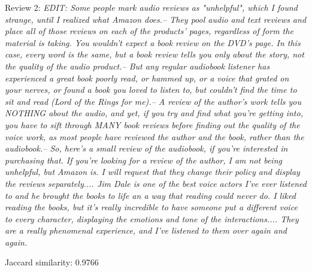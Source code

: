 \documentclass[12pt, a4paper]{article}
\begin{document}
\begin{itemize}
{    \item Review 2: \textit{EDIT: Some people mark audio reviews as "unhelpful", which I found strange, until I realized what Amazon does.-- They pool audio and text reviews and place all of those reviews on each of the products' pages, regardless of form the material is taking. You wouldn't expect a book review on the DVD's page. In this case, every word is the same, but a book review tells you only about the story, not the quality of the audio product.-- But any regular audiobook listener has experienced a great book poorly read, or hammed up, or a voice that grated on your nerves, or found a book you loved to listen to, but couldn't find the time to sit and read (Lord of the Rings for me).-- A review of the author's work tells you NOTHING about the audio, and yet, if you try and find what you're getting into, you have to sift through MANY book reviews before finding out the quality of the voice work, as most people have reviewed the author and the book, rather than the audiobook.-- So, here's a small review of the audiobook, if you're interested in purchasing that. If you're looking for a review of the author, I am not being unhelpful, but Amazon is. I will request that they change their policy and display the reviews separately.... Jim Dale is one of the best voice actors I've ever listened to and he brought the books to life an a way that reading could never do. I liked reading the books, but it's really incredible to have someone put a different voice to every character, displaying the emotions and tone of the interactions.... They are a really phenomenal experience, and I've listened to them over again and again.}
    \item Jaccard similarity: 0.9766
    }
\end{itemize}
\dotfill
\end{document}
